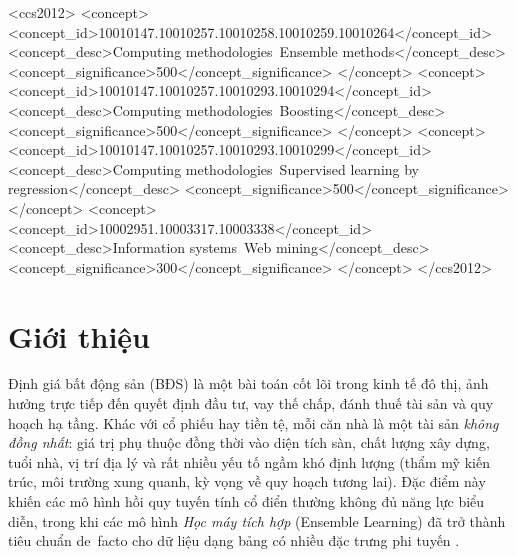 \documentclass[sigconf,nonacm]{acmart}
\begin{document}
\begin{CCSXML}
<ccs2012>
   <concept>
       <concept_id>10010147.10010257.10010258.10010259.10010264</concept_id>
       <concept_desc>Computing methodologies~Ensemble methods</concept_desc>
       <concept_significance>500</concept_significance>
   </concept>
   <concept>
       <concept_id>10010147.10010257.10010293.10010294</concept_id>
       <concept_desc>Computing methodologies~Boosting</concept_desc>
       <concept_significance>500</concept_significance>
   </concept>
   <concept>
       <concept_id>10010147.10010257.10010293.10010299</concept_id>
       <concept_desc>Computing methodologies~Supervised learning by regression</concept_desc>
       <concept_significance>500</concept_significance>
   </concept>
   <concept>
       <concept_id>10002951.10003317.10003338</concept_id>
       <concept_desc>Information systems~Web mining</concept_desc>
       <concept_significance>300</concept_significance>
   </concept>
</ccs2012>
\end{CCSXML}



\maketitle

\section{Giới thiệu}

Định giá bất động sản (BĐS) là một bài toán cốt lõi trong kinh tế đô
thị, ảnh hưởng trực tiếp đến quyết định đầu tư, vay thế chấp, đánh
thuế tài sản và quy hoạch hạ tầng. Khác với cổ phiếu hay tiền tệ, mỗi
căn nhà là một tài sản \emph{không đồng nhất}: giá trị phụ thuộc đồng
thời vào diện tích sàn, chất lượng xây dựng, tuổi nhà, vị trí địa lý
và rất nhiều yếu tố ngầm khó định lượng (thẩm mỹ kiến trúc, môi trường
xung quanh, kỳ vọng về quy hoạch tương lai). Đặc điểm này khiến các
mô hình hồi quy tuyến tính cổ điển thường không đủ năng lực biểu diễn,
trong khi các mô hình \emph{Học máy tích hợp} (Ensemble Learning) đã
trở thành tiêu chuẩn de~facto cho dữ liệu dạng bảng có nhiều đặc trưng
phi tuyến \cite{caruana2006empirical,olson2018data,fernandez2014large}.
\end{document}
